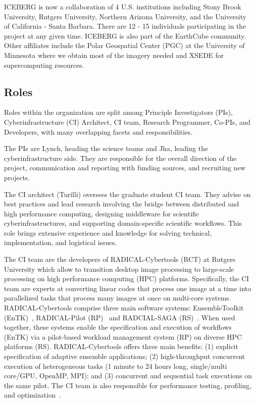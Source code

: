 \documentclass[manuscript,screen]{acmart}
\begin{document}
ICEBERG is now a collaboration of 4 U.S. institutions including Stony Brook University, Rutgers University, Northern Arizona University, and the University of California - Santa Barbara.  There are 12 - 15 individuals participating in the project at any given time.  ICEBERG is also part of the EarthCube community.  Other affiliates include the Polar Geospatial Center (PGC) at the University of Minnesota where we obtain most of the imagery needed and XSEDE for supercomputing resources.  


\subsection{Roles}
Roles within the organization are split among Principle Investigators (PIs), Cyberinfrastructure (CI) Architect, CI team, Research Programmer, Co-PIs, and Developers, with many overlapping facets and responsibilities.  

The PIs are Lynch, heading the science teams and Jha, leading the cyberinfrastructure side.  They are responsible for the overall direction of the project, communication and reporting with funding sources, and recruiting new projects.

The CI architect (Turilli) oversees the graduate student CI team.  They 
advise on best practices and lead research involving the bridge between 
distributed and high performance computing, designing middleware for 
scientific cyberinfrastructures, and supporting domain-specific scientific 
workflows.  This role brings extensive experience and knowledge for solving 
technical, implementation, and logistical issues.

The CI team are the developers of RADICAL-Cybertools (RCT) \cite{turilli2019middleware} \cite{RCTweb:20} at Rutgers University which allow to transition desktop image processing to large-scale processing on high performance computing (HPC) platforms. Specifically, the CI team are experts at converting linear codes that process one image at a time into parallelized tasks that process many images at once on multi-core systems.  RADICAL-Cybertools comprise three main software systems: EnsembleToolkit (EnTK)~\cite{balasubramanian2018harnessing}, RADICAL-Pilot (RP)~\cite{RP:18} and RADCIAL-SAGA (RS)~\cite{merzky2015saga}. When used together, these systems enable the specification and execution of workflows (EnTK) via a pilot-based workload management system (RP) on diverse HPC platforms (RS). RADICAL-Cybertools offers three main benefits: (1) explicit specification of adaptive ensemble applications; (2) high-throughput concurrent execution of heterogeneous tasks (1 minute to 24 hours long, single/multi core/GPU, OpenMP, MPI); and (3) concurrent and sequential task executions on the same pilot.
The CI team is also responsible for performance testing, profiling, and optimization~\cite{CI:20}. 
\end{document}
